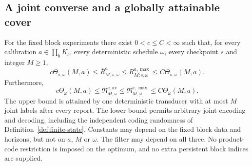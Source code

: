 \subsection{A joint converse and a globally attainable cover}
\begin{theorem}\label{thm:shared-state}
For the fixed block experiments there exist $0<c\le C<\infty$ such
that, for every calibration $a\in\prod_bK_b$, every deterministic
schedule $\omega$, every checkpoint $s$ and integer $M\ge1$,
\begin{equation}\label{eq:shared-checkpoint}
 c\Theta_{s,\omega}(M,a)
 \le\overline R^a_{M;s,\omega}
 \le R^{a,\max}_{M;s,\omega}
 \le C\Theta_{s,\omega}(M,a).
\end{equation}
Furthermore,
\begin{equation}\label{eq:shared-streaming}
 c\Theta_\omega(M,a)
 \le\mathfrak R^{a,\mathrm{av}}_{M,\omega}
 \le\mathfrak R^{a,\max}_{M,\omega}
 \le C\Theta_\omega(M,a).
\end{equation}
The upper bound is attained by one deterministic transducer with at most
$M$ joint labels after every report. The lower bound permits arbitrary
joint encoding and decoding, including the independent coding randomness
of Definition~\ref{def:finite-state}. Constants may depend on the fixed
block data and horizons, but not on $a$, $M$ or $\omega$. The filter
may depend on all three. No product-code restriction is imposed on the
optimum, and no extra persistent block indices are supplied.
\end{theorem}
